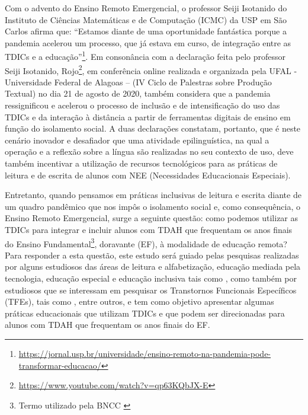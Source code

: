 \documentclass{textolivre}
\begin{document}
Com o advento do Ensino Remoto Emergencial, o professor Seiji Isotanido do Instituto de Ciências Matemáticas e de Computação (ICMC) da USP em São Carlos afirma que: “Estamos diante de uma oportunidade fantástica porque a pandemia acelerou um processo, que já estava em curso, de integração entre as TDICs e a educação”\footnote{\url{https://jornal.usp.br/universidade/ensino-remoto-na-pandemia-pode-transformar-educacao/}}. Em consonância com a declaração feita pelo professor Seiji Isotanido, Rojo\footnote{\url{https://www.youtube.com/watch?v=qp63KQbJX-E}}, em conferência online realizada e organizada pela UFAL - Universidade Federal de Alagoas – (IV Ciclo de Palestras sobre Produção Textual) no dia 21 de agosto de 2020, também considera que a pandemia ressignificou e acelerou o processo de inclusão e de intensificação do uso das TDICs e da interação à distância a partir de ferramentas digitais de ensino em função do isolamento social. A duas declarações constatam, portanto, que é neste cenário inovador e desafiador que uma atividade epilinguística, na qual a operação e a reflexão sobre a língua são realizadas no seu contexto de uso, deve também incentivar a utilização de recursos tecnológicos para as práticas de leitura e de escrita de alunos com NEE (Necessidades Educacionais Especiais). 

Entretanto, quando pensamos em práticas inclusivas de leitura e escrita diante de um quadro pandêmico que nos impôs o isolamento social e, como consequência, o Ensino Remoto Emergencial, surge a seguinte questão: como podemos utilizar as TDICs para integrar e incluir alunos com TDAH que frequentam os anos finais do Ensino Fundamental\footnote{Termo utilizado pela BNCC  \cite{brasil_base_2017}}, doravante (EF), à modalidade de educação remota? Para responder a esta questão, este estudo será guiado pelas pesquisas realizadas por alguns estudiosos das áreas de leitura e alfabetização, educação mediada pela tecnologia, educação especial e educação inclusiva tais como \textcite{alexander_2004, antunes_glossario_2001, coscarelli_letramento_2007, menezes_tecnologias_2019, rojo_multiletramentos_2012, rojo_generos_2013, amorim_TDAH}, como também por estudiosos que se interessam em pesquisar os Transtornos Funcionais Específicos (TFEs), tais como \textcite{borgesdalberio_inclusao_2012, lopes_inclusao_2011, silva_neto_educacao_2018, coscarelliribeiro_2005, rohde_transtorno_1999}, entre outros,  e tem como objetivo apresentar algumas práticas educacionais que utilizam TDICs e que podem ser direcionadas para alunos com TDAH que frequentam os anos finais do EF. 
\end{document}
